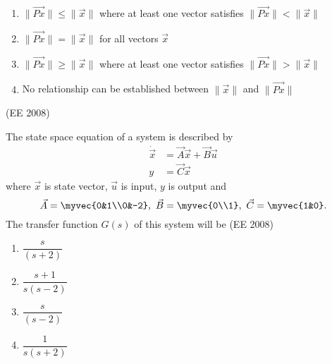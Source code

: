 \begin{enumerate}
    \item $\|\vec{Px}\| \le \|\vec{x}\|$ where at least one vector satisfies $\|\vec{Px}\| < \|\vec{x}\|$
    \item $\|\vec{Px}\| = \|\vec{x}\|$ for all vectors $\vec{x}$
    \item $\|\vec{Px}\| \ge \|\vec{x}\|$ where at least one vector satisfies $\|\vec{Px}\| > \|\vec{x}\|$
    \item No relationship can be established between $\|\vec{x}\|$ and $\|\vec{Px}\|$
\end{enumerate}
\hfill (EE 2008)
\item 
The state space equation of a system is described by
\begin{align*}
	\dot{\vec{x}} &= \vec{A}\vec{x} + \vec{B}\vec{u}\\
	y &= \vec{C}\vec{x}
\end{align*}
where $\vec{x}$ is state vector, $\vec{u}$ is input, ${y}$ is output and
$$
\vec{A}=\myvec{0&1\\0&-2},\
\vec{B}=\myvec{0\\1},\
\vec{C}=\myvec{1&0}.
	$$
The transfer function $G(s)$ of this system will be
\hfill (EE 2008) 
\begin{multicols}{4}
\begin{enumerate}
    \item $\dfrac{s}{(s+2)}$
    \item $\dfrac{s+1}{s(s-2)}$
    \item $\dfrac{s}{(s-2)}$
    \item $\dfrac{1}{s(s+2)}$
\end{enumerate}
\end{multicols}

